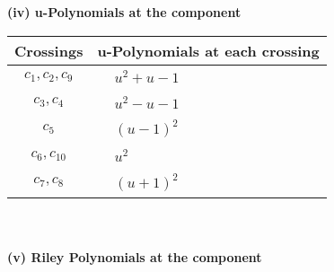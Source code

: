 \documentclass[1p]{elsarticle_modified}
\theoremstyle{definition}
\begin{document}
\newpage\renewcommand{\arraystretch}{1}
\flushleft \textbf{(iv) u-Polynomials at the component}\newline \\
\begin{tabular}{m{50pt}|m{274pt}}
Crossings & \hspace{64pt}u-Polynomials at each crossing \\
\hline $$\begin{aligned}c_{1},c_{2},c_{9}\end{aligned}$$&$\begin{aligned}
&u^2+u-1
\end{aligned}$\\
\hline $$\begin{aligned}c_{3},c_{4}\end{aligned}$$&$\begin{aligned}
&u^2- u-1
\end{aligned}$\\
\hline $$\begin{aligned}c_{5}\end{aligned}$$&$\begin{aligned}
&(u-1)^2
\end{aligned}$\\
\hline $$\begin{aligned}c_{6},c_{10}\end{aligned}$$&$\begin{aligned}
&u^2
\end{aligned}$\\
\hline $$\begin{aligned}c_{7},c_{8}\end{aligned}$$&$\begin{aligned}
&(u+1)^2
\end{aligned}$\\
\hline
\end{tabular}\\~\\
\newpage\renewcommand{\arraystretch}{1}
\flushleft \textbf{(v) Riley Polynomials at the component}\newline \\
\end{document}
